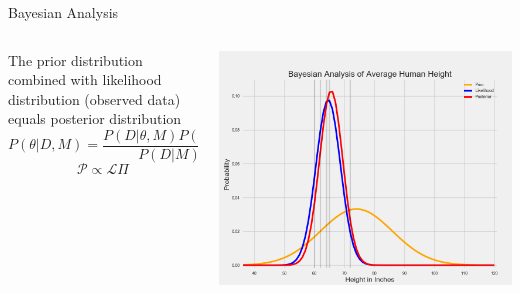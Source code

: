 \documentclass[12pt, aspectratio=149]{beamer}
\theoremstyle{plain}
\begin{document}
\begin{frame}{Bayesian Analysis}
\begin{columns}
\begin{column}{0.5\linewidth}
The prior distribution combined with likelihood distribution (observed data) equals posterior distribution
\begin{equation}
P(\theta |D,M)= \frac{P(D|\theta, M)P(\theta|M)}{P(D|M)}
\end{equation}
\begin{equation}
\mathcal{P} \propto \mathcal{L}\Pi
\end{equation}
\end{column}
\begin{column}{0.5\linewidth}
\includegraphics[scale=0.17]{figs/prior_likelihood_posterior_example.png}
\end{column}
\end{columns}
\end{frame}
\end{document}
